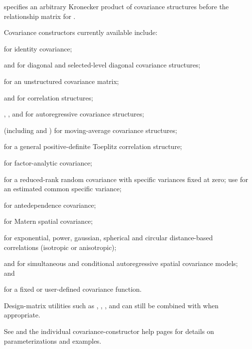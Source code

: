 \documentclass[a4paper]{book}
\begin{document}
\begin{Arguments}
\begin{ldescription}

specifies an arbitrary Kronecker product of covariance structures before the
relationship matrix for .

Covariance constructors currently available include:

 for identity covariance;

 and  for diagonal and selected-level
diagonal covariance structures;

 for an unstructured covariance matrix;

 and  for correlation structures;

, , and  for
autoregressive covariance structures;

 (including  and ) for moving-average
covariance structures;

 for a general positive-definite Toeplitz correlation
structure;

 for factor-analytic covariance;

 for a reduced-rank random covariance with specific
variances fixed at zero; use 
for an estimated common specific variance;

 for antedependence covariance;

 for Matern spatial covariance;

 for exponential, power, gaussian, spherical and
circular distance-based correlations (isotropic or anisotropic);

 and  for simultaneous and conditional
autoregressive spatial covariance models; and

 for a fixed or user-defined covariance function.

Design-matrix utilities such as ,
, , and
 can still be combined with  when
appropriate.

See  and the individual covariance-constructor help pages
for details on parameterizations and examples.


\end{ldescription}
\end{Arguments}
\end{document}
